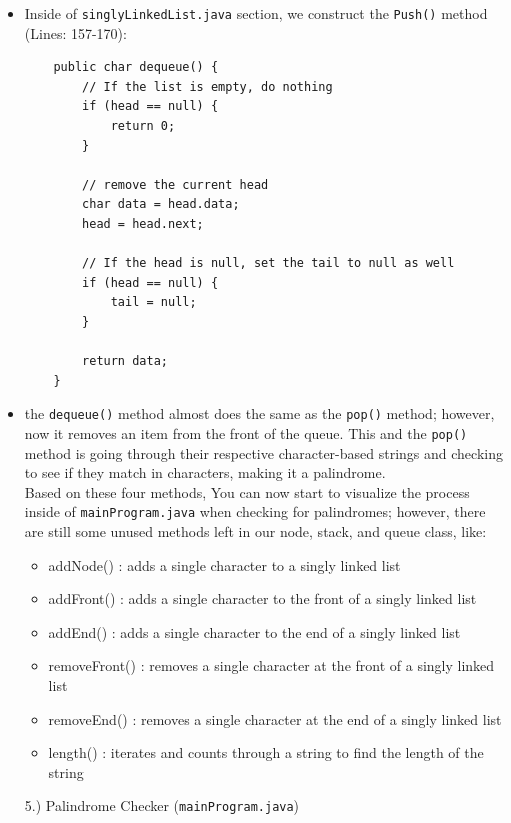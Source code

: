 \documentclass[a4paper,12pt]{article}
\begin{document}
\begin{itemize}
\item Inside of \verb|singlyLinkedList.java| section, we construct the \verb|Push()| method (Lines: 157-170):

\begin{verbatim}
    public char dequeue() {
        // If the list is empty, do nothing
        if (head == null) {
            return 0;
        }

        // remove the current head
        char data = head.data;
        head = head.next;

        // If the head is null, set the tail to null as well
        if (head == null) {
            tail = null;
        }

        return data;
    }
\end{verbatim}
\item the \verb|dequeue()| method almost does the same as the \verb|pop()| method; however, now it removes an item from the front of the queue. This and the \verb|pop()| method is going through their respective character-based strings and checking to see if they match in characters, making it a palindrome.\\

Based on these four methods, You can now start to visualize the process inside of \verb|mainProgram.java| when checking for palindromes; however, there are still some unused methods left in our node, stack, and queue class, like:
\begin{itemize}
\item addNode() : adds a single character to a singly linked list
\item addFront() : adds a single character to the front of a singly linked list
\item addEnd() : adds a single character to the end of a singly linked list
\item removeFront() : removes a single character at the front of a singly linked list
\item removeEnd() : removes a single character at the end of a singly linked list
\item length() : iterates and counts through a string to find the length of the string \\
\end{itemize}

\begin{large}
    5.) Palindrome Checker (\verb|mainProgram.java|)
\end{large}




\end{itemize}
\end{document}
